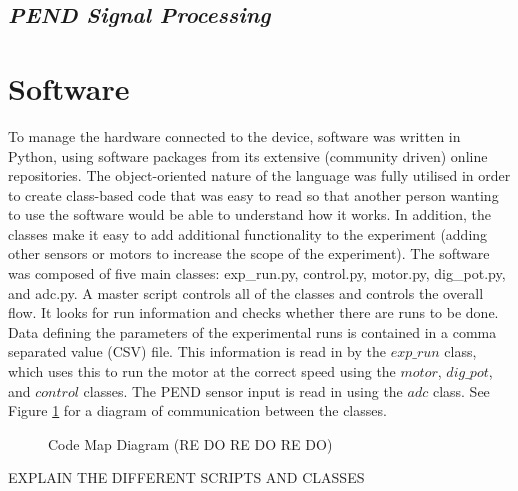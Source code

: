 \documentclass[twoside,a4]{report}
\begin{document}
	\subsection{\textit{PEND Signal Processing}}



	\section{Software} %
	To manage the hardware connected to the device, software was written in Python, using software packages from its extensive (community driven) online repositories. The object-oriented nature of the language was fully utilised in order to create class-based code that was easy to read so that another person wanting to use the software would be able to understand how it works. In addition, the classes make it easy to add additional functionality to the experiment (adding other sensors or motors to increase the scope of the experiment). The software was composed of five main classes: exp\_run.py, control.py, motor.py, dig\_pot.py, and adc.py. \newline \newline \noindent
	A master script controls all of the classes and controls the overall flow. It looks for run information and checks whether there are runs to be done. Data defining the parameters of the experimental runs is contained in a comma separated value (CSV) file. This information is read in by the \(exp\_run\) class, which uses this to run the motor at the correct speed using the \(motor\), \(dig\_pot\), and \(control\) classes. The PEND sensor input is read in using the \(adc\) class. See Figure \ref{codemap} for a diagram of communication between the classes. \newline 
	\begin{figure}[!htb]
		\centering
		\caption{Code Map Diagram (RE DO RE DO RE DO)}
		\label{codemap}
	\end{figure}
	EXPLAIN THE DIFFERENT SCRIPTS AND CLASSES
\end{document}
